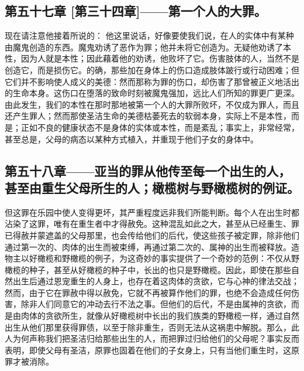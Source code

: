 
\subsection{第五十七章 [第三十四章]——第一个人的大罪。}

现在请注意他接着所说的： 他这里说话，好像要使我们说，在人的实体中有某种由魔鬼创造的东西。魔鬼劝诱了恶作为罪；他并未将它创造为。无疑他劝诱了本性，因为人就是本性；因此藉着他的劝诱，他败坏了它。伤害肢体的人，当然不是创造它，而是损伤它。的确，那些加在身体上的伤口造成肢体跛行或行动困难；但它们并不影响使人成义的美德：然而那称为罪的伤口，却伤害了那曾被正义地活出的生命本身。这伤口在堕落的致命时刻被魔鬼强加，远比人们所知的罪更广更深。由此发生，我们的本性在那时那地被第一个人的大罪所败坏，不仅成为罪人，而且还产生罪人；然而那使圣洁生命的美德枯萎死去的软弱本身，实际上不是本性，而是；正如不良的健康状态不是身体的实体或本性，而是紊乱；事实上，非常经常，甚至总是，父母的病态以某种方式植入，并重现于他们子女的身体中。\par


\subsection{第五十八章——亚当的罪从他传至每一个出生的人，甚至由重生父母所生的人；橄榄树与野橄榄树的例证。}

但这罪在乐园中使人变得更坏，其严重程度远非我们所能判断。每个人在出生时都沾染了这罪，唯有在重生者中才得赦免。这种混乱如此之大，甚至从已经重生、罪已得赦并蒙遮盖的父母那里，也会传给他们的后代，使这些孩子被定罪，除非他们通过第一次的、肉体的出生而被束缚，再通过第二次的、属神的出生而被释放。造物主以好橄榄和野橄榄的例子，为这奇妙的事实提供了一个奇妙的范例：不仅从野橄榄的种子，甚至从好橄榄的种子中，长出的也只是野橄榄。因此，即使在那些自然出生后通过恩宠重生的人身上，也存在着这肉体的贪欲，它与心神的律法交战；然而，由于它在罪赦中得以赦免，它就不再被算作他们的罪，也绝不会造成任何伤害，除非人们同意它的冲动去行不法之事。但他们的后代，不是由属神的贪欲，而是由肉体的贪欲所生，就像从好橄榄树中长出的我们族类的野橄榄一样，通过自然出生从他们那里获得罪债，以至于除非重生，否则无法从这祸患中解脱。那么，此人为何声称我们把圣洁归给那些出生的人，而把罪过归给他们的父母呢？事实反而表明，即使父母有圣洁，原罪也固着在他们的子女身上，只有当他们重生时，这原罪才被消除。\par


